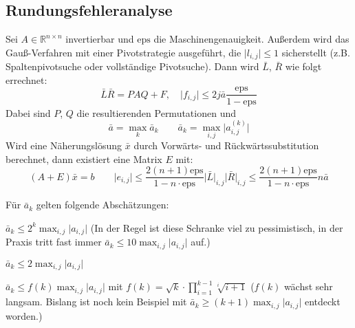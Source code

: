 \documentclass[a4paper, 11pt, accentcolor = tud3b]{tudreport}
\newcommand{\abs}[1]{\ensuremath{{\lvert #1 \rvert}}}
\newcommand{\R}{\ensuremath{\mathbb{R}}}
\begin{document}
	        \subsection{Rundungsfehleranalyse}
	            Sei \( A \in \R^{n \times n} \) invertierbar und \( \textrm{eps} \) die Maschinengenauigkeit. Außerdem wird das Gauß-Verfahren mit einer Pivotstrategie ausgeführt, die \( \abs{l_{i,j}} \leq 1 \) sicherstellt (z.B. Spaltenpivotsuche oder vollständige Pivotsuche). Dann wird \( \bar{L} \), \( \bar{R} \) wie folgt errechnet:
	            \begin{equation*}
		            \bar{L}\bar{R} = PAQ + F, \quad \abs{f_{i,j}} \leq 2 j \bar{a} \frac{\textrm{eps}}{1 - \textrm{eps}}
	            \end{equation*}
	            Dabei sind \(P\), \(Q\) die resultierenden Permutationen und
	            \begin{equation*}
		            \bar{a} = \max_k \bar{a}_k \qquad \bar{a}_k = \max_{i,j} \abs{a_{i,j}^{(k)}}
	            \end{equation*}
	            Wird eine Näherungslösung \( \bar{x} \) durch Vorwärts- und Rückwärtssubstitution berechnet, dann existiert eine Matrix \(E\) mit:
	            \begin{equation*}
		            (A + E) \bar{x} = b \qquad \abs{e_{i,j}} \leq \frac{2(n + 1) \textrm{eps}}{1 - n \cdot \textrm{eps}} \abs{\bar{L}}_{i,j} \abs{\bar{R}}_{i,j} \leq \frac{2(n + 1) \textrm{eps}}{1 - n \cdot \textrm{eps}} n \bar{a}
	            \end{equation*}
	            
	            Für \( \bar{a}_k \) gelten folgende Abschätzungen:
	            \begin{description}[leftmargin = 5cm]
	            	\item[Spaltenpivotsuche] \( \bar{a}_k \leq 2^k \max_{i,j} \abs{a_{i,j}} \) (In der Regel ist diese Schranke viel zu pessimistisch, in der Praxis tritt fast immer \( \bar{a}_k \leq 10 \max_{i,j} \abs{a_{i,j}} \) auf.)
	            	\item[Spaltenpivotsuche (bei Tridiagonalmatrizen)] \( \bar{a}_k \leq 2 \max_{i,j} \abs{a_{i,j}} \)
	            	\item[Vollständige Pivotsuche] \( \bar{a}_k \leq f(k) \max_{i,j} \abs{a_{i,j}} \) mit \( f(k) = \sqrt{k} \cdot \prod_{i = 1}^{k - 1} \sqrt[i]{i + 1} \) (\(f(k)\) wächst sehr langsam. Bislang ist noch kein Beispiel mit \( \bar{a}_k \geq (k + 1) \max_{i,j} \abs{a_{i,j}} \) entdeckt worden.)
	            \end{description}
	
\end{document}
